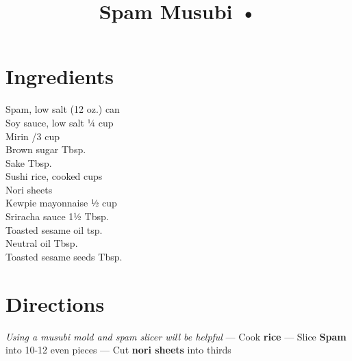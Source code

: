 \documentclass[11pt,letterpaper]{article}
\title{Spam Musubi •}
\author{}
\date{}
\begin{document}
\maketitle
\thispagestyle{empty}

\section*{Ingredients}
\setlength{\columnsep}{20pt}
\begin{multicols}{2}
\noindent
    Spam, low salt  (12 oz.) can \\
    Soy sauce, low salt \dotfill ¼ cup \\
    Mirin /3 cup \\
    Brown sugar  Tbsp. \\
    Sake  Tbsp. \\
    Sushi rice, cooked  cups \\
    Nori sheets  \\
    Kewpie mayonnaise \dotfill ½ cup \\
    Sriracha sauce \dotfill 1½ Tbsp. \\
    Toasted sesame oil  tsp. \\
    Neutral oil  Tbsp. \\
    Toasted sesame seeds  Tbsp.
\end{multicols}

\section*{Directions}

\noindent
\textit{Using a musubi mold and spam slicer will be helpful} ---
Cook \textbf{rice} ---
Slice \textbf{Spam} into 10-12 even pieces ---
Cut \textbf{nori sheets} into thirds
\end{document}
